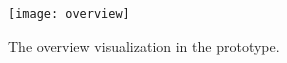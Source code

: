 \begin{figure}[ht]
  \texttt{[image: overview]}
  \caption[Overview]{The overview visualization in the prototype.}
  \label{fig:overview}
  \centering
\end{figure}